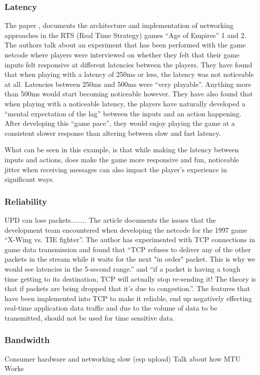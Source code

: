 \subsubsection{Latency}
The paper , documents the architecture and implementation of networking approaches in the RTS (Real Time Strategy) games ``Age of Empires'' 1 and 2. The authors talk about an experiment that has been performed with the game netcode where players were interviewed on whether they felt that their game inputs felt responsive at different latencies between the players. They have found that when playing with a latency of 250ms or less, the latency was not noticeable at all. Latencies between 250ms and 500ms were ``very playable''. Anything more than 500ms would start becoming noticeable however. They have also found that when playing with a noticeable latency, the players have naturally developed a ``mental expectation of the lag'' between the inputs and an action happening. After developing this ``game pace'', they would enjoy playing the game at a consistent slower response than altering between slow and fast latency.

What can be seen in this example, is that while making the latency between inputs and actions, does make the game more responsive and fun, noticeable jitter when receiving messages can also impact the player's experience in significant ways.


\subsubsection{Reliability}
UPD can lose packets........ The article  documents the issues that the development team encountered when developing the netcode for the 1997 game ``X-Wing vs. TIE fighter''. The author has experimented with TCP connections in game data transmission and found that ``TCP refuses to deliver any of the other packets in the stream while it waits for the next "in order" packet. This is why we would see latencies in the 5-second range.'' and ``if a packet is having a tough time getting to its destination, TCP will actually stop re-sending it! The theory is that if packets are being dropped that it's due to congestion.''. The features that have been implemented into TCP to make it reliable, end up negatively effecting real-time application data traffic and due to the volume of data to be transmitted, should not be used for time sensitive data.

\subsubsection{Bandwidth}
Consumer hardware and networking slow (esp upload)
Talk about how MTU Works

